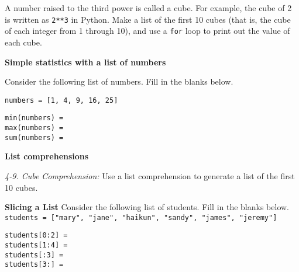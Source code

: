 \documentclass[a4paper,addpoints]{exam}
\begin{document}
\begin{questions}
    \question A number raised to the third power is called a cube. For example, the cube of 2 is written as \texttt{2**3} in Python.
    Make a list of the first 10 cubes (that is, the cube of each integer from 1 through 10), and use a \texttt{for} loop to print out the value of each cube.
    \begin{solutionorlines}[7cm]
    \end{solutionorlines}
    

    \textbf{Simple statistics with a list of numbers}

    \question Consider the following list of numbers. Fill in the blanks below.
    \begin{verbatim}
numbers = [1, 4, 9, 16, 25]
    \end{verbatim}
    \begin{spacing}{2}
        \texttt{min(numbers) = } \fillin[1][1cm] \\
        \texttt{max(numbers) = } \fillin[25][1cm] \\
        \texttt{sum(numbers) = } \fillin[55][1cm]
    \end{spacing}
    \vspace{15pt}


    \textbf{List comprehensions}

    \question \textit{4-9. Cube Comprehension:} Use a list comprehension to generate a list of the first 10 cubes.
    \begin{solutionorlines}[2cm]
    \end{solutionorlines}


    \textbf{Slicing a List}
    \question Consider the following list of students. Fill in the blanks below. \\
    \texttt{students = ["mary", "jane", "haikun", "sandy", "james", "jeremy"]}
    \begin{spacing}{2}
        \texttt{students[0:2] = } \fillin[1][10cm] \\
        \texttt{students[1:4] = } \fillin[25][10cm] \\
        \texttt{students[:3] = } \fillin[55][10cm] \\
        \texttt{students[3:] = } \fillin[55][10cm]
    \end{spacing}
    \vspace{15pt}

\end{questions}
\end{document}
